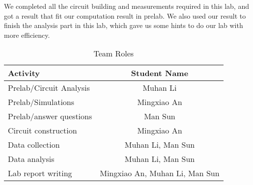 \phantom{ } We completed all the circuit building and measurements required in this lab, and got a result that fit our computation result in prelab. We also used our result to finish the analysis part in this lab, which gave us some hints to do our lab with more efficiency. \\
\begin{table}[!htbp]
	\caption{Team Roles}
	\renewcommand\arraystretch{1.5}\centering
	\begin{tabular}{l|c}
		\hline
		\hline
		Activity					&	Student Name 	\\
		\hline
		Prelab/Circuit Analysis		& 	Muhan Li		\\
		\hline
		Prelab/Simulations			&	Mingxiao An		\\
		\hline
		Prelab/answer questions		&	Man Sun			\\
		\hline
		Circuit construction		&	Mingxiao An		\\
		\hline
		Data collection				& Muhan Li, Man Sun	\\
		\hline
		Data analysis				& Muhan Li, Man Sun \\
		\hline
		Lab report writing			& Mingxiao An, Muhan Li, Man Sun \\
		\hline
		\hline
	\end{tabular}\\
\end{table}